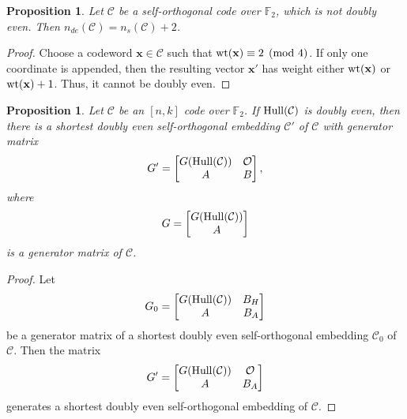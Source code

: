 \documentclass{article}
\newtheorem{proposition}[theorem]{Proposition}
\theoremstyle{definition}
\theoremstyle{remark}
\begin{document}
\begin{proposition}
    Let $\mathcal{C}$ be a self-orthogonal code over $\mathbb{F}_2$, which is not doubly even. Then $n_{de}(\mathcal{C})=n_s(\mathcal{C})+2$.
\end{proposition}
\begin{proof}
    Choose a codeword $\mathbf{x}\in\mathcal{C}$ such that ${\rm wt}(\mathbf{x})\equiv 2\pmod 4$. If only one coordinate is appended, then the resulting vector $\mathbf{x}'$ has weight either ${\rm wt}(\mathbf{x})$ or ${\rm wt}(\mathbf{x})+1$. Thus, it cannot be doubly even.
\end{proof}

\begin{proposition}\label{doublyevengen}
Let $\mathcal{C}$ be an $[n, k]$ code over $\mathbb{F}_2$. If ${\rm Hull}(\mathcal{C})$ is doubly even, then there is a shortest doubly even self-orthogonal embedding $\mathcal{C}'$ of $\mathcal{C}$ with generator matrix
\[
    G'=\begin{bmatrix}
        G({\rm Hull}(\mathcal{C})) & \mathcal{O}\\A & B
    \end{bmatrix},
\]
where
\[
G=\begin{bmatrix}
        G({\rm Hull}(\mathcal{C}))\\A
    \end{bmatrix}
\]
is a generator matrix of $\mathcal{C}$. 
\end{proposition}
\begin{proof}
    Let
    \[
    G_0=\begin{bmatrix}
        G({\rm Hull}(\mathcal{C})) & B_H\\A & B_A
    \end{bmatrix}
    \]
    be a generator matrix of a shortest doubly even self-orthogonal embedding $\mathcal{C}_0$ of $\mathcal{C}$. Then the matrix
    \[
    G'=\begin{bmatrix}
        G({\rm Hull}(\mathcal{C})) & \mathcal{O}\\A & B_A
    \end{bmatrix}
    \]
    generates a shortest doubly even self-orthogonal embedding of $\mathcal{C}$.
\end{proof}
\end{document}

